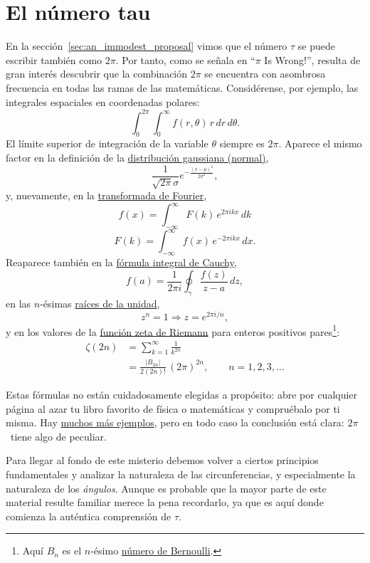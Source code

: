 
\section{El número tau} %
\label{sec:the_number_tau}

En la sección~\ref{sec:an_immodest_proposal} vimos que el número $\tau$ se puede escribir también como $2\pi$. Por tanto, como se señala en ``$\pi$ Is Wrong!'', resulta de gran interés descubrir que la combinación $2\pi$ se encuentra con asombrosa frecuencia en todas las ramas de las matemáticas. Considérense, por ejemplo, las integrales espaciales en coordenadas polares:
\[
  \int_0^{2\pi}\int_0^\infty f(r, \theta)\, r\, dr\, d\theta.
\]
El límite superior de integración de la variable $\theta$ siempre es $2\pi$. Aparece el mismo factor en la definición de la \href{https://es.wikipedia.org/wiki/Distribución_normal}{distribución gaussiana (normal)},
\[
  \frac{1}{\sqrt{2\pi}\sigma}e^{-\frac{(x-\mu)^2}{2\sigma^2}},
\]
y, nuevamente, en la  \href{http://mathworld.wolfram.com/FourierTransform.html}{transformada de Fourier},
\[
  f(x) = \int_{-\infty}^\infty F(k)\, e^{2\pi ikx}\,dk
\]
\[
    F(k) = \int_{-\infty}^\infty f(x)\, e^{-2\pi ikx}\,dx.
\]
Reaparece también en la \href{https://es.wikipedia.org/wiki/Fórmula_integral_de_Cauchy}{fórmula integral de Cauchy},
\[
  f(a) = \frac{1}{2\pi i}\oint_\gamma\frac{f(z)}{z-a}\,dz,
\]
en las $n$-ésimas \href{https://es.wikipedia.org/wiki/Raíz_de_la_unidad}{raíces de la unidad},
\[
  z^n = 1 \Rightarrow z = e^{2\pi i/n},
\]
y en los valores de la \href{https://es.wikipedia.org/wiki/Función_zeta_de_Riemann}{función zeta de Riemann} para enteros positivos pares\footnote{Aquí $B_n$ es el $n$-ésimo \href{https://es.wikipedia.org/wiki/Número_de_Bernoulli}{número de Bernoulli}.}:
\[
\begin{split}
  \zeta(2n) & = \sum_{k=1}^\infty \frac{1}{k^{2n}} \\
            & = \frac{|B_{2n}|}{2(2n)!}\,(2\pi)^{2n},\qquad n = 1, 2, 3, \ldots
\end{split}
\]

Estas fórmulas no están cuidadosamente elegidas a propósito: abre por cualquier página al azar tu libro favorito de física o matemáticas y compruébalo por ti misma. Hay \href{http://www.harremoes.dk/Peter/Undervis/Turnpage/Turnpage1.html}{muchos más ejemplos}, pero en todo caso la conclusión está clara: $2\pi$~tiene algo de peculiar.

Para llegar al fondo de este misterio debemos volver a ciertos principios fundamentales y analizar la naturaleza de las circunferencias, y especialmente la naturaleza de los \emph{ángulos}. Aunque es probable que la mayor parte de este material resulte familiar merece la pena recordarlo, ya que es aquí donde comienza la auténtica comprensión de $\tau$.

